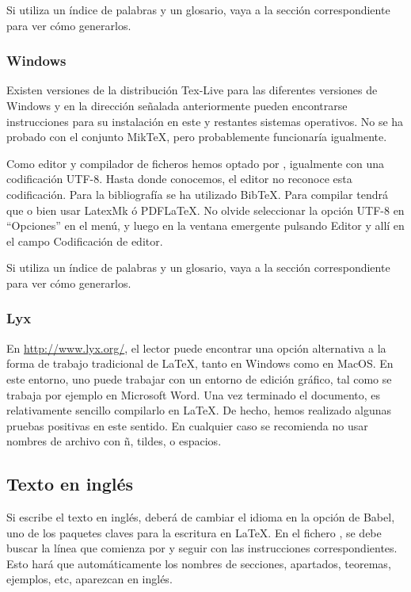 Si utiliza un índice de palabras y un glosario, vaya a la sección correspondiente para ver cómo generarlos.

\subsubsection{Windows\tsp{\textregistered}}

Existen versiones de la distribución Tex-Live para las diferentes versiones de Windows\tsp{\textregistered} y en la dirección señalada anteriormente pueden encontrarse instrucciones para su instalación en este y restantes sistemas operativos. No se ha probado con el conjunto MikTeX, pero probablemente funcionaría igualmente.

Como editor y compilador de ficheros hemos optado por \tsp{\textregistered}, igualmente con una codificación UTF-8. Hasta donde conocemos, el editor \tsp{\textregistered} no reconoce esta codificación. Para la bibliografía se ha utilizado BibTeX. Para compilar tendrá que o bien usar LatexMk ó PDFLaTeX. No olvide seleccionar la opción UTF-8 en ``Opciones'' en el menú, y luego en la ventana emergente pulsando Editor y allí en el campo Codificación de editor. 

Si utiliza un índice de palabras y un glosario, vaya a la sección correspondiente para ver cómo generarlos.

\subsubsection{Lyx}

En \url{http://www.lyx.org/}, el lector puede encontrar una opción alternativa a la forma de trabajo tradicional de \LaTeX, tanto en Windows\tsp{\textregistered} como en MacOS\tsp{\textregistered}. En este entorno, uno puede trabajar con un entorno de edición gráfico, tal como se trabaja por ejemplo en Microsoft Word\tsp{\textregistered}. Una vez terminado el documento, es relativamente sencillo compilarlo en \LaTeX. De hecho, hemos realizado algunas pruebas positivas en este sentido. En cualquier caso se recomienda no usar nombres de archivo con ñ, tildes, o espacios. 

\subsection{Texto en inglés}
Si escribe el texto en inglés, deberá de cambiar el idioma en la opción de Babel, uno de los paquetes claves para la escritura en \LaTeX. En el fichero , se debe buscar la línea que comienza por  y seguir con las instrucciones correspondientes. Esto hará que automáticamente los nombres de secciones, apartados, teoremas, ejemplos, etc, aparezcan en inglés. 

